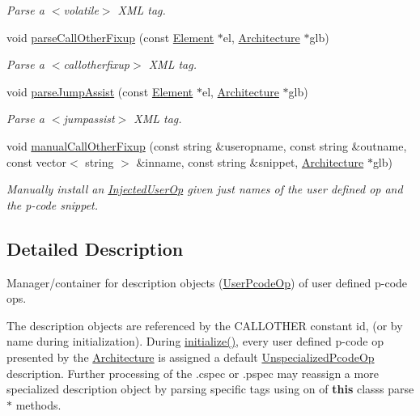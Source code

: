 \begin{DoxyCompactItemize}
\begin{DoxyCompactList}\small\item\em Parse a $<$volatile$>$ X\+ML tag. \end{DoxyCompactList}\item 
void \mbox{\hyperlink{class_user_op_manage_ad692cedd6253a601e45116ed8dc402bd}{parse\+Call\+Other\+Fixup}} (const \mbox{\hyperlink{class_element}{Element}} $\ast$el, \mbox{\hyperlink{class_architecture}{Architecture}} $\ast$glb)
\begin{DoxyCompactList}\small\item\em Parse a $<$callotherfixup$>$ X\+ML tag. \end{DoxyCompactList}\item 
void \mbox{\hyperlink{class_user_op_manage_ad51fcfacc1f75bb23dcad875eda155f9}{parse\+Jump\+Assist}} (const \mbox{\hyperlink{class_element}{Element}} $\ast$el, \mbox{\hyperlink{class_architecture}{Architecture}} $\ast$glb)
\begin{DoxyCompactList}\small\item\em Parse a $<$jumpassist$>$ X\+ML tag. \end{DoxyCompactList}\item 
void \mbox{\hyperlink{class_user_op_manage_aa18eec5842807b13c5ad174377fc14f0}{manual\+Call\+Other\+Fixup}} (const string \&useropname, const string \&outname, const vector$<$ string $>$ \&inname, const string \&snippet, \mbox{\hyperlink{class_architecture}{Architecture}} $\ast$glb)
\begin{DoxyCompactList}\small\item\em Manually install an \mbox{\hyperlink{class_injected_user_op}{Injected\+User\+Op}} given just names of the user defined op and the p-\/code snippet. \end{DoxyCompactList}\end{DoxyCompactItemize}


\subsection{Detailed Description}
Manager/container for description objects (\mbox{\hyperlink{class_user_pcode_op}{User\+Pcode\+Op}}) of user defined p-\/code ops. 

The description objects are referenced by the C\+A\+L\+L\+O\+T\+H\+ER constant id, (or by name during initialization). During \mbox{\hyperlink{class_user_op_manage_a3a4220cee8c82eb2a30b527bb952a4d6}{initialize()}}, every user defined p-\/code op presented by the \mbox{\hyperlink{class_architecture}{Architecture}} is assigned a default \mbox{\hyperlink{class_unspecialized_pcode_op}{Unspecialized\+Pcode\+Op}} description. Further processing of the .cspec or .pspec may reassign a more specialized description object by parsing specific tags using on of {\bfseries{this}} class\textquotesingle{}s parse$\ast$ methods. 

